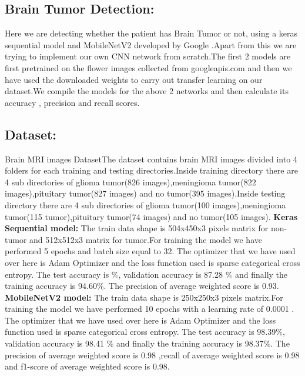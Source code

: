 \documentclass[journal]{IEEEtran}
\begin{document}
\subsection{Brain Tumor Detection:}
\label{PA:DP}
Here we are detecting whether the patient has Brain Tumor or not, using a keras sequential model and MobileNetV2 developed by Google .Apart from this we are trying to implement our own CNN network from scratch.The first 2 models are first pretrained on the flower images collected from googleapis.com and then we have used the downloaded weights to carry out transfer learning on our dataset.We compile the models for the above 2 networks and then calculate its accuracy , precision and recall scores.
\newline
\subsection{Dataset:}
Brain MRI images Dataset\cite{Kaggle-MRI-Dataset}The dataset contains brain MRI images divided into 4 folders for each training and testing directories.Inside training directory there are 4 sub directories of glioma tumor(826 images),meningioma tumor(822 images),pituitary tumor(827 images) and no tumor(395 images).Inside testing directory there are 4 sub directories of glioma tumor(100 images),meningioma tumor(115 tumor),pituitary tumor(74 images) and no tumor(105 images).\newline
\textbf{Keras Sequential model:}\newline
The train data shape is 504x450x3 pixels matrix for non-tumor and 512x512x3 matrix for tumor.For training the model we have performed 5 epochs and batch size equal to 32. The optimizer that we have used over here is Adam Optimizer and the loss function used is sparse categorical cross entropy. The test accuracy is  $\%$, validation accuracy is 87.28 $\%$ and finally the training accuracy is 94.60$\%$. The precision of average weighted score is 0.93. \newline
\textbf{MobileNetV2 model:}\newline
The train data shape is 250x250x3 pixels matrix.For training the model we have performed 10 epochs with a learning rate of 0.0001 . The optimizer that we have used over here is Adam Optimizer and the loss function used is sparse categorical cross entropy. The test accuracy is 98.39$\%$, validation accuracy is 98.41 $\%$ and finally the training accuracy is 98.37$\%$. The precision of average weighted score is 0.98 ,recall of average weighted score is 0.98 and f1-score of average weighted score is 0.98.\newline
\end{document}
